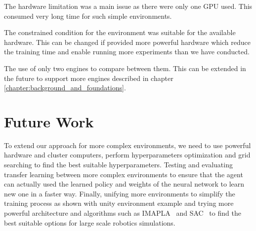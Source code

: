 The hardware limitation was a main issue as there were only one GPU used. This consumed very long time for such simple environments.

The constrained condition for the environment was suitable for the available hardware. This can be changed if provided more powerful hardware which reduce the training time and enable running more experiments than we have conducted.

The use of only two engines to compare between them. This can be extended in the future to support more engines described in chapter \autoref{chapter:background_and_foundations}.

\section{Future Work}

To extend our approach for more complex environments, we need to use powerful hardware and cluster computers, perform hyperparameters optimization and grid searching to find the best suitable hyperparameters. Testing and evaluating transfer learning between more complex environments to ensure that the agent can actually used the learned policy and weights of the neural network to learn new one in a faster way. Finally, unifying more environments to simplify the training process as shown with unity environment example and trying more powerful architecture and algorithms such as IMAPLA~\parencite{espeholt2018impala} and SAC~\parencite{haarnoja2018soft} to find the best suitable options for large scale robotics simulations.